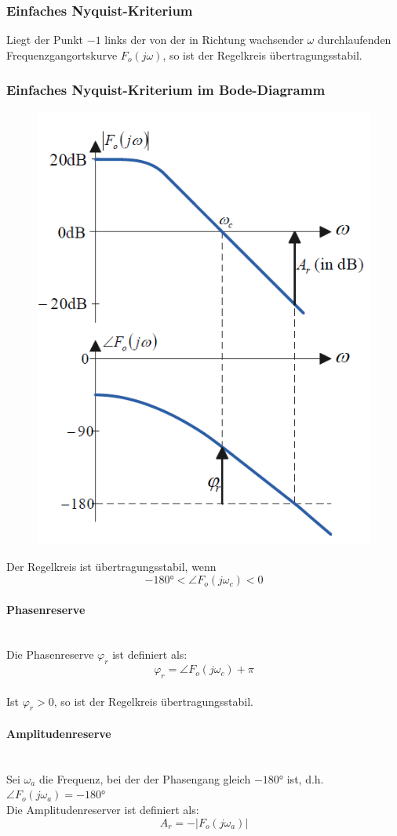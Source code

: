 \documentclass[10pt,a4paper]{article}
\begin{document}
\subsubsection{Einfaches Nyquist-Kriterium}
Liegt der Punkt $-1$ links der von der in Richtung wachsender $\omega$ durchlaufenden Frequenzgangortskurve $F_o(j \omega)$, so ist der Regelkreis übertragungsstabil. \\

\subsubsection{Einfaches Nyquist-Kriterium im Bode-Diagramm}
\begin{figure}[H]
	\includegraphics[width = 0.4\columnwidth]{imgs/nyquist_bode.png}
\end{figure}
Der Regelkreis ist übertragungsstabil, wenn
$$
	-180° < \angle F_o(j \omega_c) < 0
$$

\paragraph{Phasenreserve} ~\\
Die Phasenreserve $\varphi_r$ ist definiert als:
$$
	\varphi_r = \angle F_o(j \omega_c) + \pi
$$ \\

Ist $\varphi_r > 0$, so ist der Regelkreis übertragungsstabil.

\paragraph{Amplitudenreserve} ~\\
Sei $\omega_a$ die Frequenz, bei der der Phasengang gleich $-180°$ ist, d.h. $\angle F_o(j \omega_a) = -180°$ \\
Die Amplitudenreserver ist definiert als:
$$
	A_r = -|F_o(j \omega_a)|
$$ \\
\end{document}
